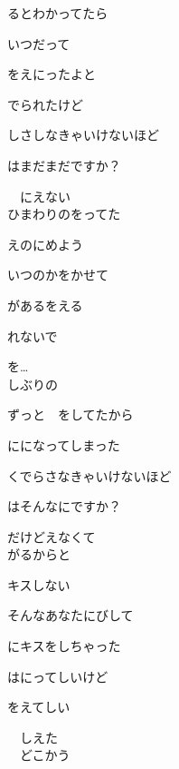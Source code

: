 るとわかってたら

いつだって

をえにったよと

でられたけど

しさしなきゃいけないほど

はまだまだですか？

　にえない
\\

ひまわりのをってた

えのにめよう

いつのかをかせて

があるをえる

れないで

を…
\\

しぶりの

ずっと　をしてたから

にになってしまった

くでらさなきゃいけないほど

はそんなにですか？

だけどえなくて
\\

がるからと

キスしない

そんなあなたにびして

にキスをしちゃった

はにってしいけど

をえてしい

　しえた
\\

　どこかう
\\
